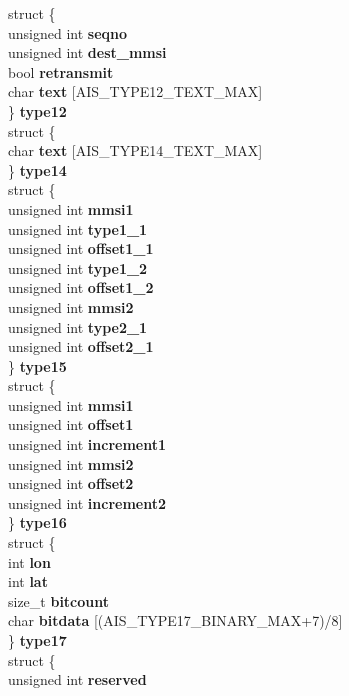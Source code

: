 \begin{DoxyCompactItemize}
{\begin{tabbing}
\>struct \{\\
\>\>unsigned int {\bfseries seqno}\\
\>\>unsigned int {\bfseries dest\_mmsi}\\
\>\>bool {\bfseries retransmit}\\
\>\>char {\bfseries text} \mbox{[}AIS\_TYPE12\_TEXT\_MAX\mbox{]}\\
\>\} {\bfseries type12}\\
\>struct \{\\
\>\>char {\bfseries text} \mbox{[}AIS\_TYPE14\_TEXT\_MAX\mbox{]}\\
\>\} {\bfseries type14}\\
\>struct \{\\
\>\>unsigned int {\bfseries mmsi1}\\
\>\>unsigned int {\bfseries type1\_1}\\
\>\>unsigned int {\bfseries offset1\_1}\\
\>\>unsigned int {\bfseries type1\_2}\\
\>\>unsigned int {\bfseries offset1\_2}\\
\>\>unsigned int {\bfseries mmsi2}\\
\>\>unsigned int {\bfseries type2\_1}\\
\>\>unsigned int {\bfseries offset2\_1}\\
\>\} {\bfseries type15}\\
\>struct \{\\
\>\>unsigned int {\bfseries mmsi1}\\
\>\>unsigned int {\bfseries offset1}\\
\>\>unsigned int {\bfseries increment1}\\
\>\>unsigned int {\bfseries mmsi2}\\
\>\>unsigned int {\bfseries offset2}\\
\>\>unsigned int {\bfseries increment2}\\
\>\} {\bfseries type16}\\
\>struct \{\\
\>\>int {\bfseries lon}\\
\>\>int {\bfseries lat}\\
\>\>size\_t {\bfseries bitcount}\\
\>\>char {\bfseries bitdata} \mbox{[}(AIS\_TYPE17\_BINARY\_MAX+7)/8\mbox{]}\\
\>\} {\bfseries type17}\\
\>struct \{\\
\>\>unsigned int {\bfseries reserved}\\

\end{tabbing}}
\end{DoxyCompactItemize}
